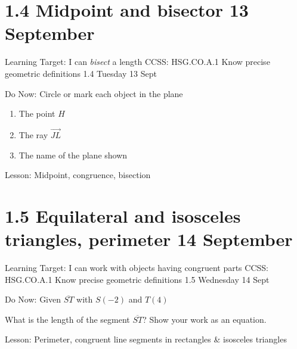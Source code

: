 \section{1.4 Midpoint and bisector \hfill 13 September}
\begin{frame}{Learning Target: I can \emph{bisect} a length}
  {CCSS: HSG.CO.A.1 Know precise geometric definitions  \hfill \alert{1.4 Tuesday 13 Sept}}
  \begin{block}{Do Now: Circle or mark each object in the plane}
    \begin{enumerate} 
      \item The point $H$
      \item The ray $\overrightarrow{JL}$
      \item The name of the plane shown
      \end{enumerate}
    \begin{center}
    \end{center}
    \end{block}
    Lesson: Midpoint, congruence, bisection
  \end{frame}

\section{1.5 Equilateral and isosceles triangles, perimeter \hfill 14 September}
\begin{frame}{Learning Target: I can work with objects having congruent parts}
  {CCSS: HSG.CO.A.1 Know precise geometric definitions  \hfill \alert{1.5 Wednesday 14 Sept}}
    \begin{block}{Do Now: Given $\overline{ST}$ with $S(-2)$ and $T(4)$}
      \begin{center}
      \end{center}
    What is the length of the segment $\overline{ST}$? Show your work as an equation.
    \end{block} \vspace{2cm}
    Lesson: Perimeter, congruent line segments in rectangles \& isosceles triangles
  \end{frame}

